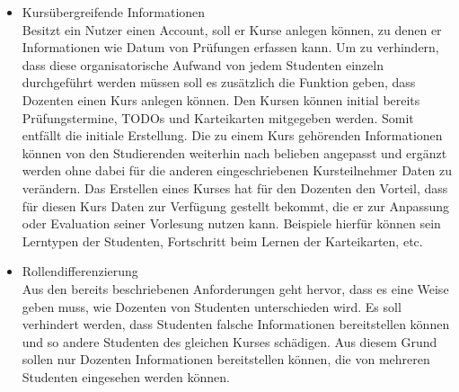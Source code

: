 \begin{itemize}
    \item Kursübergreifende Informationen   \\
        Besitzt ein Nutzer einen Account, soll er Kurse anlegen können, zu denen er Informationen wie Datum von Prüfungen erfassen kann.
        Um zu verhindern, dass diese organisatorische Aufwand von jedem Studenten einzeln durchgeführt werden müssen soll es zusätzlich die Funktion geben, dass Dozenten einen Kurs anlegen können.
        Den Kursen können initial bereits Prüfungstermine, TODOs und Karteikarten mitgegeben werden.
        Somit entfällt die initiale Erstellung.
        Die zu einem Kurs gehörenden Informationen können von den Studierenden weiterhin nach belieben angepasst und ergänzt werden ohne dabei für die anderen eingeschriebenen Kursteilnehmer Daten zu verändern.
        Das Erstellen eines Kurses hat für den Dozenten den Vorteil, dass für diesen Kurs Daten zur Verfügung gestellt bekommt, die er zur Anpassung oder Evaluation seiner Vorlesung nutzen kann.
        Beispiele hierfür können sein Lerntypen der Studenten, Fortschritt beim Lernen der Karteikarten, etc.
    \item Rollendifferenzierung             \\
        Aus den bereits beschriebenen Anforderungen geht hervor, dass es eine Weise geben muss, wie Dozenten von Studenten unterschieden wird.
        Es soll verhindert werden, dass Studenten falsche Informationen bereitstellen können und so andere Studenten des gleichen Kurses schädigen.
        Aus diesem Grund sollen nur Dozenten Informationen bereitstellen können, die von mehreren Studenten eingesehen werden können.
\end{itemize}





